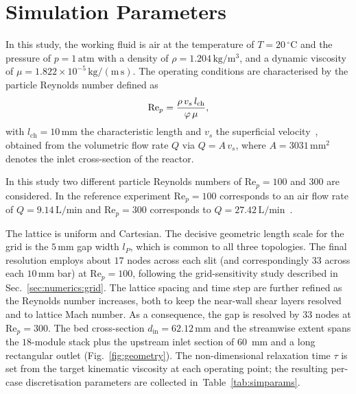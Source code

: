 \section{Simulation Parameters}
\label{sec:numerics:params}

In this study, the working fluid is air at the temperature of $T = 20\,^\circ\mathrm{C}$ and the pressure of $p = 1\,\mathrm{atm}$ with a density of $\rho = 1.204\,\mathrm{kg/m^3}$, and a dynamic viscosity of $\mu = 1.822\times10^{-5}\,\mathrm{kg/(m\,s)}$. The operating conditions are characterised by the particle Reynolds number defined as
\begin{equation}
    \hbox{Re}_p = \frac{\rho\,v_s\,l_\mathrm{ch}}{\varphi\,\mu},
    \label{eq:rep}
\end{equation}
with $l_\mathrm{ch}=10\,\mathrm{mm}$ the characteristic length and $v_s$ the superficial velocity~\cite{velten2026}, obtained from the volumetric flow rate $Q$ via $Q = A\,v_s$, where $A = 3031\,\mathrm{mm^2}$ denotes the inlet cross-section of the reactor.

In this study two different particle Reynolds numbers of Re$_p=100$ and $300$ are considered. In the reference experiment Re$_p = 100$ corresponds to an air flow rate of $Q = 9.14\,\mathrm{L/min}$ and Re$_p = 300$ corresponds to $Q = 27.42\,\mathrm{L/min}$~\cite{velten2026}.

The lattice is uniform and Cartesian. The decisive geometric length scale for the grid is the $5\,\mathrm{mm}$ gap width $l_P$, which is common to all three topologies. The final resolution employs about $17$ nodes across each slit (and correspondingly $33$ across each $10\,\mathrm{mm}$ bar) at Re$_p = 100$, following the grid-sensitivity study described in Sec.~\ref{sec:numerics:grid}. The lattice spacing and time step are further refined as the Reynolds number increases, both to keep the near-wall shear layers resolved and to  lattice Mach number. As a consequence, the gap is resolved by $33$ nodes at Re$_p = 300$. The bed cross-section $d_\mathrm{in} = 62.12\,\mathrm{mm}$ and the streamwise extent spans the $18$-module stack plus the upstream inlet section of 60~mm and a long rectangular outlet (Fig.~\ref{fig:geometry}). The non-dimensional relaxation time $\tau$ is set from the target kinematic viscosity at each operating point; the resulting per-case discretisation parameters are collected in~Table~\ref{tab:simparams}.

